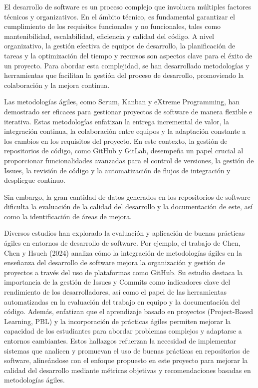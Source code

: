 
El desarrollo de software es un proceso complejo que involucra múltiples factores técnicos y organizativos. En el ámbito técnico, es fundamental garantizar el cumplimiento de los requisitos funcionales y no funcionales, tales como mantenibilidad, escalabilidad, eficiencia y calidad del código\cite{isoiec25000}. A nivel organizativo, la gestión efectiva de equipos de desarrollo, la planificación de tareas y la optimización del tiempo y recursos son aspectos clave para el éxito de un proyecto. Para abordar esta complejidad, se han desarrollado metodologías y herramientas que facilitan la gestión del proceso de desarrollo, promoviendo la colaboración y la mejora continua.

Las metodologías ágiles, como Scrum\cite{sutherland2014scrum}, Kanban\cite{roe2017kanban} y eXtreme Programming\cite{beck2004extreme}, han demostrado ser eficaces para gestionar proyectos de software de manera flexible e iterativa. Estas metodologías enfatizan la entrega incremental de valor, la integración continua, la colaboración entre equipos y la adaptación constante a los cambios en los requisitos del proyecto. En este contexto, la gestión de repositorios de código, como GitHub y GitLab, desempeña un papel crucial al proporcionar funcionalidades avanzadas para el control de versiones, la gestión de Issues, la revisión de código y la automatización de flujos de integración y despliegue continuo.

Sin embargo, la gran cantidad de datos generados en los repositorios de software dificulta la evaluación de la calidad del desarrollo y la documentación de este, así como la identificación de áreas de mejora. 

Diversos estudios han explorado la evaluación y aplicación de buenas prácticas ágiles en entornos de desarrollo de software. Por ejemplo, el trabajo de Chen, Chen y Hsueh (2024)\cite{Chen2024} analiza cómo la integración de metodologías ágiles en la enseñanza del desarrollo de software mejora la organización y gestión de proyectos a través del uso de plataformas como GitHub. Su estudio destaca la importancia de la gestión de Issues y Commits como indicadores clave del rendimiento de los desarrolladores, así como el papel de las herramientas automatizadas en la evaluación del trabajo en equipo y la documentación del código. Además, enfatizan que el aprendizaje basado en proyectos (Project-Based Learning, PBL) y la incorporación de prácticas ágiles permiten mejorar la capacidad de los estudiantes para abordar problemas complejos y adaptarse a entornos cambiantes. Estos hallazgos refuerzan la necesidad de implementar sistemas que analicen y promuevan el uso de buenas prácticas en repositorios de software, alineándose con el enfoque propuesto en este proyecto para mejorar la calidad del desarrollo mediante métricas objetivas y recomendaciones basadas en metodologías ágiles.

